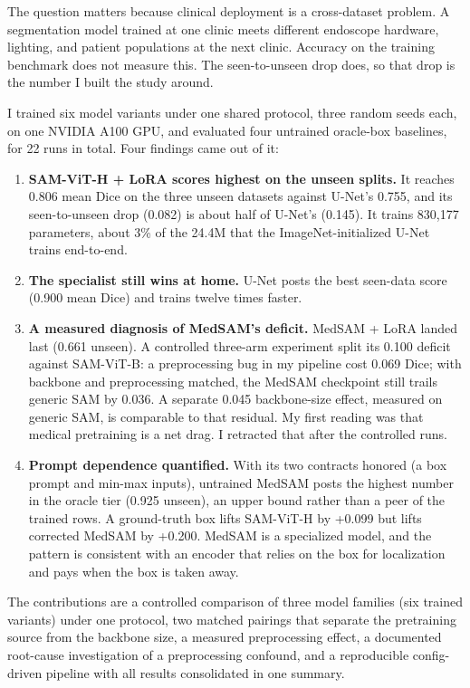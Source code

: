 \documentclass[conference]{IEEEtran}
\begin{document}
The question matters because clinical deployment is a cross-dataset problem. A segmentation model trained at one clinic meets different endoscope hardware, lighting, and patient populations at the next clinic. Accuracy on the training benchmark does not measure this. The seen-to-unseen drop does, so that drop is the number I built the study around.

I trained six model variants under one shared protocol, three random seeds each, on one NVIDIA A100 GPU, and evaluated four untrained oracle-box baselines, for 22 runs in total. Four findings came out of it:

\begin{enumerate}
\item \textbf{SAM-ViT-H + LoRA scores highest on the unseen splits.} It reaches 0.806 mean Dice on the three unseen datasets against U-Net's 0.755, and its seen-to-unseen drop (0.082) is about half of U-Net's (0.145). It trains 830,177 parameters, about 3\% of the 24.4M that the ImageNet-initialized U-Net trains end-to-end.
\item \textbf{The specialist still wins at home.} U-Net posts the best seen-data score (0.900 mean Dice) and trains twelve times faster.
\item \textbf{A measured diagnosis of MedSAM's deficit.} MedSAM + LoRA landed last (0.661 unseen). A controlled three-arm experiment split its 0.100 deficit against SAM-ViT-B: a preprocessing bug in my pipeline cost 0.069 Dice; with backbone and preprocessing matched, the MedSAM checkpoint still trails generic SAM by 0.036. A separate 0.045 backbone-size effect, measured on generic SAM, is comparable to that residual. My first reading was that medical pretraining is a net drag. I retracted that after the controlled runs.
\item \textbf{Prompt dependence quantified.} With its two contracts honored (a box prompt and min-max inputs), untrained MedSAM posts the highest number in the oracle tier (0.925 unseen), an upper bound rather than a peer of the trained rows. A ground-truth box lifts SAM-ViT-H by +0.099 but lifts corrected MedSAM by +0.200. MedSAM is a specialized model, and the pattern is consistent with an encoder that relies on the box for localization and pays when the box is taken away.
\end{enumerate}
The contributions are a controlled comparison of three model families (six trained variants) under one protocol, two matched pairings that separate the pretraining source from the backbone size, a measured preprocessing effect, a documented root-cause investigation of a preprocessing confound, and a reproducible config-driven pipeline with all results consolidated in one summary.
\end{document}
